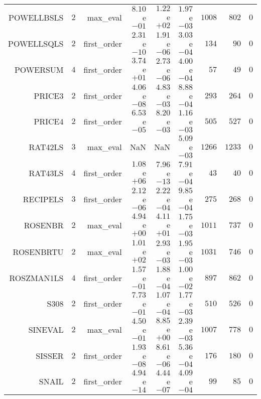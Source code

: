 \begin{longtable}{rrrrrrrrr}
POWELLBSLS & \(     2\) & max\_eval & \( 8.10\)e\(-01\) & \( 1.22\)e\(+02\) & \( 1.97\)e\(-03\) & \(  1008\) & \(   802\) & \(     0\) \\
POWELLSQLS & \(     2\) & first\_order & \( 2.31\)e\(-10\) & \( 1.91\)e\(-06\) & \( 3.03\)e\(-04\) & \(   134\) & \(    90\) & \(     0\) \\
POWERSUM & \(     4\) & first\_order & \( 3.74\)e\(+01\) & \( 2.73\)e\(-06\) & \( 4.00\)e\(-04\) & \(    57\) & \(    49\) & \(     0\) \\
PRICE3 & \(     2\) & first\_order & \( 4.06\)e\(-08\) & \( 4.83\)e\(-03\) & \( 8.88\)e\(-04\) & \(   293\) & \(   264\) & \(     0\) \\
PRICE4 & \(     2\) & first\_order & \( 6.53\)e\(-05\) & \( 8.20\)e\(-03\) & \( 1.16\)e\(-03\) & \(   505\) & \(   527\) & \(     0\) \\
RAT42LS & \(     3\) & max\_eval &       NaN &       NaN & \( 5.09\)e\(-03\) & \(  1266\) & \(  1233\) & \(     0\) \\
RAT43LS & \(     4\) & first\_order & \( 1.08\)e\(+06\) & \( 7.96\)e\(-13\) & \( 7.91\)e\(-04\) & \(    43\) & \(    40\) & \(     0\) \\
RECIPELS & \(     3\) & first\_order & \( 2.12\)e\(-06\) & \( 2.22\)e\(-04\) & \( 9.85\)e\(-04\) & \(   275\) & \(   268\) & \(     0\) \\
ROSENBR & \(     2\) & max\_eval & \( 4.94\)e\(+00\) & \( 4.11\)e\(+01\) & \( 1.75\)e\(-03\) & \(  1011\) & \(   737\) & \(     0\) \\
ROSENBRTU & \(     2\) & max\_eval & \( 1.01\)e\(+02\) & \( 2.93\)e\(-03\) & \( 1.95\)e\(-03\) & \(  1031\) & \(   746\) & \(     0\) \\
ROSZMAN1LS & \(     4\) & first\_order & \( 1.57\)e\(-01\) & \( 1.88\)e\(-04\) & \( 1.00\)e\(-02\) & \(   897\) & \(   862\) & \(     0\) \\
S308 & \(     2\) & first\_order & \( 7.73\)e\(-01\) & \( 1.07\)e\(-04\) & \( 1.77\)e\(-03\) & \(   510\) & \(   526\) & \(     0\) \\
SINEVAL & \(     2\) & max\_eval & \( 4.50\)e\(-01\) & \( 8.85\)e\(+00\) & \( 2.39\)e\(-03\) & \(  1007\) & \(   778\) & \(     0\) \\
SISSER & \(     2\) & first\_order & \( 1.93\)e\(-08\) & \( 8.61\)e\(-06\) & \( 5.36\)e\(-04\) & \(   176\) & \(   180\) & \(     0\) \\
SNAIL & \(     2\) & first\_order & \( 4.94\)e\(-14\) & \( 4.44\)e\(-07\) & \( 4.09\)e\(-04\) & \(    99\) & \(    85\) & \(     0\) \\

\end{longtable}
